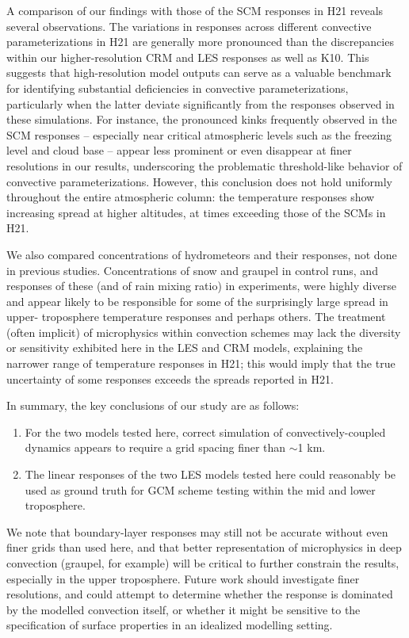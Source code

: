 \documentclass[draft]{agujournal2019}
\begin{document}
A comparison of our findings with those of the SCM responses in H21 reveals
several observations. The variations in responses across different convective
parameterizations in H21 are generally more pronounced than the discrepancies
within our higher-resolution CRM and LES responses as well as K10. This suggests
that high-resolution model outputs can serve as a valuable benchmark for
identifying substantial deficiencies in convective parameterizations,
particularly when the latter deviate significantly from the responses observed
in these simulations. For instance, the pronounced kinks frequently observed in
the SCM responses -- especially near critical atmospheric levels such as the
freezing level and cloud base -- appear less prominent or even disappear at
finer resolutions in our results, underscoring the problematic threshold-like
behavior of convective parameterizations. However, this conclusion does not hold
uniformly throughout the entire atmospheric column: the temperature responses
show increasing spread at higher altitudes, at times exceeding those of the SCMs
in H21. 

We also compared concentrations of hydrometeors and their
responses, not done in previous studies. Concentrations of snow and graupel in control runs, and responses of
these (and of rain mixing ratio) in experiments, were highly diverse and appear
likely to be responsible for some of the surprisingly large spread in upper-
troposphere temperature responses and perhaps others. The treatment (often
implicit) of microphysics within convection schemes may lack the diversity or
sensitivity exhibited here in the LES and CRM models, explaining the narrower
range of temperature responses in H21; this would imply that the true
uncertainty of some responses exceeds the spreads reported in H21.

In summary, the key conclusions of our study are as follows:

\begin{enumerate}
    \item For the two models tested here, correct simulation of
    convectively-coupled dynamics appears to require a grid spacing finer than
    $\sim$1 km.
    \item The linear responses of the two LES models tested here could
    reasonably be used as ground truth for GCM scheme testing within the mid and
    lower troposphere.
\end{enumerate}

We note that boundary-layer responses may still not be accurate without even
finer grids than used here, and that better representation of microphysics in
deep convection (graupel, for example) will be critical to further constrain the
results, especially in the upper troposphere. Future work should investigate
finer resolutions, and could attempt to determine whether the response is
dominated by the modelled convection itself, or whether it might be sensitive to
the specification of surface properties in an idealized modelling setting.
\end{document}
